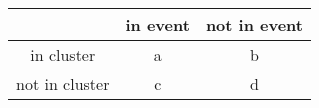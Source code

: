 \begin{tabular}{c|cc}
\toprule
{} & in event & not in event \\
\midrule
in cluster     &       a &           b \\
not in cluster &       c &           d \\
\bottomrule
\end{tabular}
